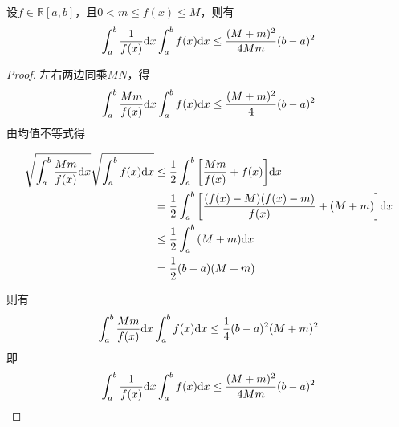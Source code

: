 \begin{theorem}
    
    设$f\in\mathbb{R}[a,b]$，且$0<m\leq f(x) \leq M$，则有
    $$ \int_{a}^{b}{\dfrac{1}{f(x)}}\mathrm{d} x \int_{a}^{b}{f(x)}\mathrm{d} x \leq \dfrac{(M+m)^2}{4Mm}(b-a)^2 $$

\end{theorem}

\begin{proof}
    
    左右两边同乘$MN$，得
    $$\int_{a}^{b}{\dfrac{Mm}{f(x)}}\mathrm{d} x \int_{a}^{b}{f(x)}\mathrm{d} x \leq \dfrac{(M+m)^2}{4}(b-a)^2$$
    由均值不等式得

    \begin{align*}
        \sqrt{\int_{a}^{b}{\dfrac{Mm}{f(x)}}\mathrm{d} x} \sqrt{\int_{a}^{b}{f(x)}\mathrm{d} x} & \leq \dfrac{1}{2} \int_{a}^{b}{\left[\dfrac{Mm}{f(x)}+f(x)\right]}\mathrm{d} x\\
        & = \dfrac{1}{2} \int_{a}^{b}{\left[\dfrac{(f(x)-M)(f(x)-m)}{f(x)}+(M+m)\right]}\mathrm{d} x\\
        & \leq \dfrac{1}{2} \int_{a}^{b}{(M+m)}\mathrm{d} x\\
        & = \dfrac{1}{2}(b-a)(M+m)
    \end{align*}

    则有
    $$\int_{a}^{b}{\dfrac{Mm}{f(x)}}\mathrm{d} x \int_{a}^{b}{f(x)}\mathrm{d} x \leq\dfrac{1}{4} (b-a)^2(M+m)^2$$
    即
    $$ \int_{a}^{b}{\dfrac{1}{f(x)}}\mathrm{d} x \int_{a}^{b}{f(x)}\mathrm{d} x \leq \dfrac{(M+m)^2}{4Mm}(b-a)^2 $$

\end{proof}